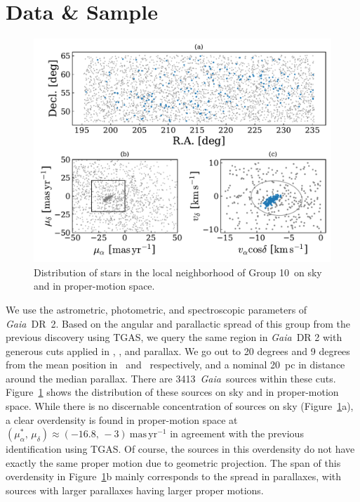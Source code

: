 \documentclass[modern,letterpaper]{aastex61}
\newcommand{\project}[1]{\textsl{#1}}
\newcommand{\acronym}[1]{{\small{#1}}}
\newcommand{\gaia}{\project{Gaia}}
\newcommand{\figname}{Figure}
\newcommand{\tgas}{\acronym{TGAS}}
\newcommand{\groupTen}{Group 10}
\newcommand{\ra}{\text{R.A.}}
\newcommand{\dec}{\text{Decl.}}
\newcommand{\pmra}{\ensuremath{\mu_\alpha^*}}
\newcommand{\pmdec}{\ensuremath{\mu_\delta}}
\newcommand{\masyr}{\ensuremath{\mathrm{mas}\,\mathrm{yr}^{-1}}}
\newcommand{\nstarsInRegion}{3413}
\begin{document}
\section{Data \& Sample}
\label{sec:data}

\begin{figure}
  \includegraphics[width=0.95\linewidth]{g10_sky_pm.pdf}
  \caption{Distribution of stars in the local neighborhood of \groupTen\ on sky and in proper-motion space.}
  \label{fig:distributions}
\end{figure}

We use the astrometric, photometric, and spectroscopic parameters of
\gaia\ DR~2.
Based on the angular and parallactic spread of this group from the previous
discovery using \tgas, we query the same region in \gaia\ DR 2 with generous
cuts applied in \ra, \dec, and parallax.
We go out to 20 degrees and 9 degrees from the mean position in \ra\ and \dec\
respectively, and a nominal 20~pc in distance around the median parallax.
There are \nstarsInRegion\ \gaia\ sources within these cuts.
Figure~\ref{fig:distributions} shows the distribution of these sources on sky
and in proper-motion space.
While there is no discernable concentration of sources on sky
(\figname~\ref{fig:distributions}a),
a clear overdensity is found in proper-motion space at
$(\pmra,\,\pmdec)\approx(-16.8,\,-3)~\masyr$ in agreement with the previous
identification using \tgas.
Of course, the sources in this overdensity do not have exactly the same proper
motion due to geometric projection.
The span of this overdensity in \figname~\ref{fig:distributions}b
mainly corresponds to the spread in parallaxes,
with sources with larger parallaxes having larger proper motions.
\end{document}
